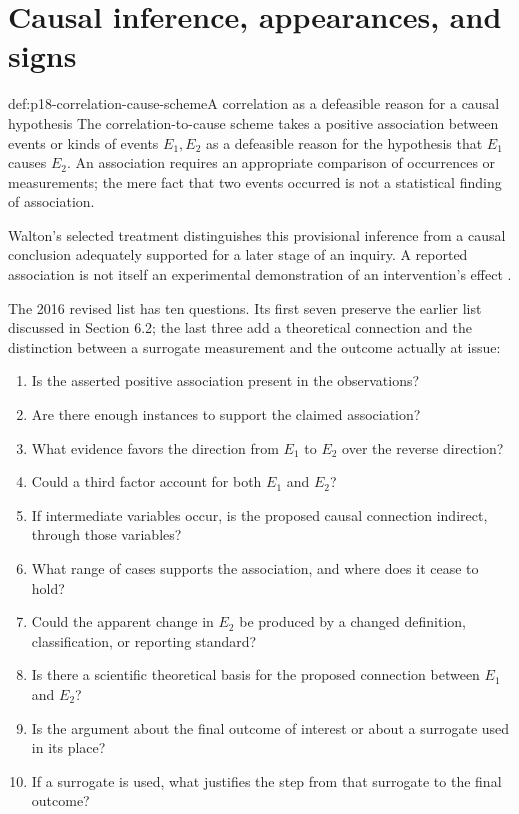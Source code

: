 \section{Causal inference, appearances, and signs}
\label{sec:p18-scheme-causal}

\begin{hbdefinition}{def:p18-correlation-cause-scheme}{A correlation as a defeasible reason for a causal hypothesis}
The correlation-to-cause scheme takes a positive association between
events or kinds of events \(E_1,E_2\) as a defeasible reason for
the hypothesis that \(E_1\) causes \(E_2\).
An association requires an appropriate comparison of occurrences or
measurements; the mere fact that two events occurred is not a
statistical finding of association.

Walton's selected treatment distinguishes this provisional inference
from a causal conclusion adequately supported for a later stage of
an inquiry. A reported association is not itself an experimental
demonstration of an intervention's effect
\cite[Sections 6.2 and 6.9--6.10]{Walton2016ArgumentEvaluation}.
\end{hbdefinition}

The 2016 revised list has ten questions. Its first seven preserve
the earlier list discussed in Section 6.2; the last three add a
theoretical connection and the distinction between a surrogate
measurement and the outcome actually at issue:

\begin{enumerate}
\item Is the asserted positive association present in the observations?
\item Are there enough instances to support the claimed association?
\item What evidence favors the direction from \(E_1\) to \(E_2\)
over the reverse direction?
\item Could a third factor account for both \(E_1\) and \(E_2\)?
\item If intermediate variables occur, is the proposed causal connection
indirect, through those variables?
\item What range of cases supports the association, and where does
it cease to hold?
\item Could the apparent change in \(E_2\) be produced by a changed
definition, classification, or reporting standard?
\item Is there a scientific theoretical basis for the proposed
connection between \(E_1\) and \(E_2\)?
\item Is the argument about the final outcome of interest or about
a surrogate used in its place?
\item If a surrogate is used, what justifies the step from that surrogate
to the final outcome?
\end{enumerate}

